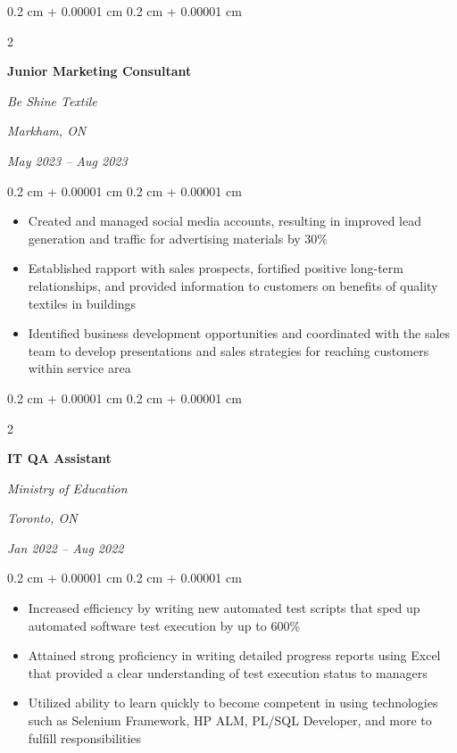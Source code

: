 \documentclass[10pt, letterpaper]{article}
\newenvironment{highlights}{
    \begin{itemize}[
        topsep=0.10 cm,
        parsep=0.10 cm,
        partopsep=0pt,
        itemsep=0pt,
        leftmargin=0.4 cm + 10pt
    ]
}{
    \end{itemize}
} %
\newenvironment{onecolentry}{
    \begin{adjustwidth}{
        0.2 cm + 0.00001 cm
    }{
        0.2 cm + 0.00001 cm
    }
}{
    \end{adjustwidth}
} %
\newenvironment{twocolentry}[2][]{
    \onecolentry
    \def\secondColumn{#2}
    \setcolumnwidth{\fill, 4.5 cm}
    \begin{paracol}{2}
}{
    \switchcolumn \raggedleft \secondColumn
    \end{paracol}
    \endonecolentry
} %
\begin{document}
        
        \begin{twocolentry}{
        \textit{Markham, ON}    
            
        \textit{May 2023 – Aug 2023}}
            \textbf{Junior Marketing Consultant}
            
            \textit{Be Shine Textile}
        \end{twocolentry}

        \vspace{0.10 cm}
        \begin{onecolentry}
            \begin{highlights}
                \item Created and managed social media accounts, resulting in improved lead generation and traffic for advertising materials by 30\%
                \item Established rapport with sales prospects, fortified positive long-term relationships, and provided information to customers on benefits of quality textiles in buildings
                \item Identified business development opportunities and coordinated with the sales team to develop presentations and sales strategies for reaching customers within service area
            \end{highlights}
        \end{onecolentry}


        \vspace{0.2 cm}

        \begin{twocolentry}{
        \textit{Toronto, ON}    
            
        \textit{Jan 2022 – Aug 2022}}
            \textbf{IT QA Assistant}
            
            \textit{Ministry of Education}
        \end{twocolentry}

        \vspace{0.10 cm}
        \begin{onecolentry}
            \begin{highlights}
                \item Increased efficiency by writing new automated test scripts that sped up automated software test execution by up to 600\%
                \item Attained strong proficiency in writing detailed progress reports using Excel that provided a clear understanding of test execution status to managers
                \item Utilized ability to learn quickly to become competent in using technologies such as Selenium Framework, HP ALM, PL/SQL Developer, and more to fulfill responsibilities
            \end{highlights}
        \end{onecolentry}
\end{document}
